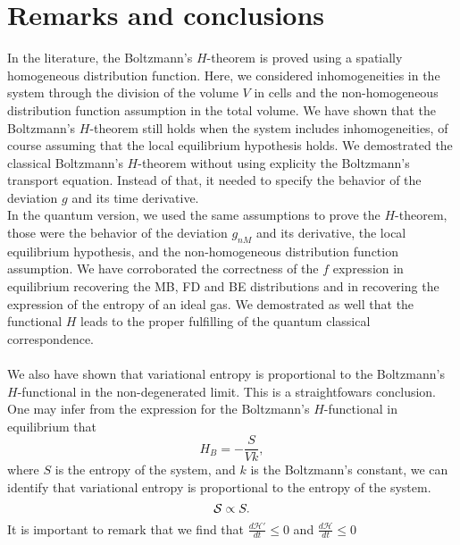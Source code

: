 
\section{Remarks and conclusions}\label{sec:disscussion}

In the literature, the Boltzmann's $H$-theorem is proved using a spatially homogeneous distribution function. 
Here, we considered inhomogeneities in the system through the division of the volume $V$ in cells 
and the non-homogeneous distribution function assumption in the total volume. 
We have shown that the Boltzmann's $H$-theorem still holds when the system includes 
inhomogeneities, of course assuming that the local equilibrium hypothesis holds. 
We demostrated the classical Boltzmann's $H$-theorem without using explicity the Boltzmann's transport equation. 
Instead of that, it needed to specify the behavior of the deviation $g$ and its time derivative. 
\\
In the quantum version, we used the same assumptions to prove the $H$-theorem, those were the 
behavior of the deviation $g_{nM}$ and its derivative, the local equilibrium hypothesis, and the 
non-homogeneous distribution function assumption. 
We have corroborated the correctness of the $f$ expression in equilibrium recovering 
the MB, FD and BE distributions and in recovering the expression of the entropy of an ideal gas. 
We demostrated as well that the functional $H$ leads to the proper fulfilling of the quantum classical correspondence.
\\
\\
We also have shown that variational entropy is proportional to the Boltzmann's $H$-functional in the non-degenerated limit. 
This is a straightfowars conclusion. One may infer from the expression for the Boltzmann's $H$-functional in equilibrium that
\begin{equation}
    H_{B}=-\frac{S}{Vk},
\end{equation}
where $S$ is the entropy of the system, and $k$ is the Boltzmann's constant, we can identify that variational entropy is proportional to the entropy of the system.\\
\begin{equation}
    \mathcal{S}\propto S.
\end{equation}
It is important to remark that we find that $\frac{d\mathcal{H}'}{dt}\leq 0$ and $\frac{d\mathcal{H}}{dt}\leq 0$ 
